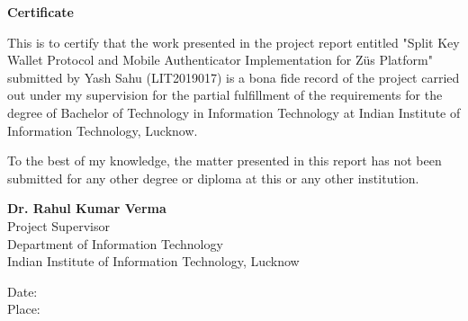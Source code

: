 
\begin{center}
    \Large \textbf{Certificate}
\end{center}

This is to certify that the work presented in the project report entitled "Split Key Wallet Protocol and Mobile Authenticator Implementation for Züs Platform" submitted by Yash Sahu (LIT2019017) is a bona fide record of the project carried out under my supervision for the partial fulfillment of the requirements for the degree of Bachelor of Technology in Information Technology at Indian Institute of Information Technology, Lucknow.

To the best of my knowledge, the matter presented in this report has not been submitted for any other degree or diploma at this or any other institution.

\vspace{1cm}

\begin{flushright}
    \textbf{Dr. Rahul Kumar Verma}\\
    Project Supervisor\\
    Department of Information Technology\\
    Indian Institute of Information Technology, Lucknow
\end{flushright}

\vspace{2cm}

\begin{flushleft}
    Date: \underline{\hspace{5cm}}\\
    Place: \underline{\hspace{5cm}}
\end{flushleft}
